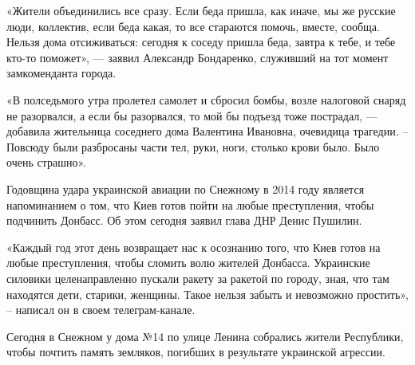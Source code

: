 «Жители объединились все сразу. Если беда пришла, как иначе, мы же русские
люди, коллектив, если беда какая, то все стараются помочь, вместе, сообща.
Нельзя дома отсиживаться: сегодня к соседу пришла беда, завтра к тебе, и тебе
кто-то поможет», — заявил Александр Бондаренко, служивший на тот момент
замкоменданта города.

«В полседьмого утра пролетел самолет и сбросил бомбы, возле налоговой снаряд не
разорвался, а если бы разорвался, то мой бы подъезд тоже пострадал, — добавила
жительница соседнего дома Валентина Ивановна, очевидица трагедии. – Повсюду
были разбросаны части тел, руки, ноги, столько крови было. Было очень страшно».

Годовщина удара украинской авиации по Снежному в 2014 году является
напоминанием о том, что Киев готов пойти на любые преступления, чтобы подчинить
Донбасс. Об этом сегодня заявил глава ДНР Денис Пушилин.

«Каждый год этот день возвращает нас к осознанию того, что Киев готов на любые
преступления, чтобы сломить волю жителей Донбасса. Украинские силовики
целенаправленно пускали ракету за ракетой по городу, зная, что там находятся
дети, старики, женщины. Такое нельзя забыть и невозможно простить», – написал
он в своем телеграм-канале.

Сегодня в Снежном у дома №14 по улице Ленина собрались жители Республики, чтобы
почтить память земляков, погибших в результате украинской агрессии.



  
